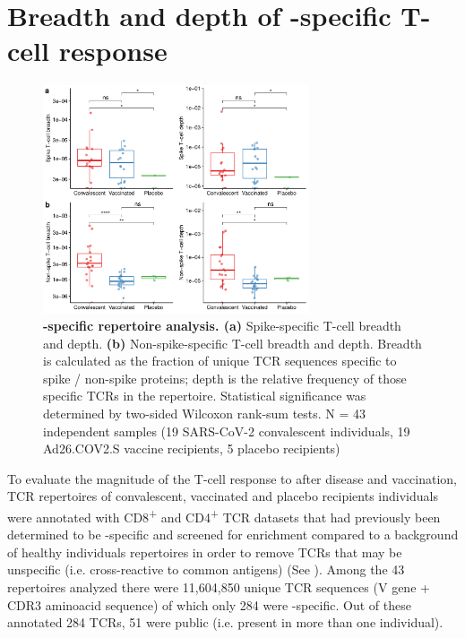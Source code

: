 




\section*{Breadth and depth of \covid-specific T-cell response}

\begin{figure}[!t]
	\centering
	\includegraphics[width=0.7\textwidth,keepaspectratio]{figures/fig2.pdf}
	\caption{\textbf{\covid-specific \TCRB{} repertoire analysis. (a)} Spike-specific T-cell breadth and depth. \textbf{(b)} Non-spike-specific T-cell breadth and depth. Breadth is calculated as the fraction of unique TCR sequences specific to spike / non-spike proteins; depth is the relative frequency of those specific TCRs in the repertoire. Statistical significance was determined by two-sided Wilcoxon rank-sum tests. N = 43 independent samples (19 SARS-CoV-2 convalescent individuals, 19 Ad26.COV2.S vaccine recipients, 5 placebo recipients)}
	\label{fig:bd}
\end{figure}

To evaluate the magnitude of the T-cell response to \covid{} after disease and vaccination, TCR repertoires of convalescent, vaccinated and placebo recipients individuals were annotated with CD8\textsuperscript{+} and CD4\textsuperscript{+} TCR datasets that had previously been determined to be \covid-specific and screened for enrichment compared to a background of healthy individuals repertoires in order to remove TCRs that may be unspecific (i.e. cross-reactive to common antigens) (See ). Among the 43 repertoires analyzed there were 11,604,850 unique TCR sequences (V gene + CDR3 aminoacid sequence) of which only 284 were \covid-specific. Out of these annotated 284 TCRs, 51 were public (i.e. present in more than one individual).

